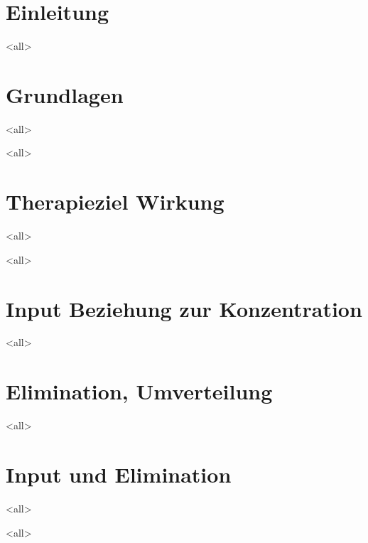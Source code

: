 \mode*
\section{Einleitung}
\mode<all>

\section{Grundlagen}
\mode<all>

\mode<all>

\section{Therapieziel Wirkung}
\mode<all>

\mode<all>

\section{Input Beziehung zur Konzentration}
\mode<all>

\section{Elimination, Umverteilung}
\mode<all>

\section{Input und Elimination}
\mode<all>

\mode<all>






